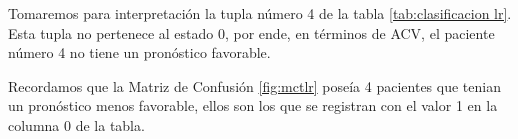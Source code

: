 \begin{table}[H]
\centering
\setlength{\tabcolsep}{10pt}
\caption{Predicciones probabilísticas con clasificación final Logistic Regression}
\label{tab:clasificacion lr}
\end{table}

	Tomaremos para interpretación la tupla número 4 de la tabla \ref{tab:clasificacion lr}. Esta tupla no pertenece al estado 0, por ende, en términos de ACV, el paciente número 4 no tiene un pronóstico favorable. 
\par Recordamos que la Matriz de Confusión \ref{fig:mctlr} poseía 4 pacientes que tenian un pronóstico menos favorable, ellos son los que se registran con el valor 1 en la columna 0 de la tabla.\\
